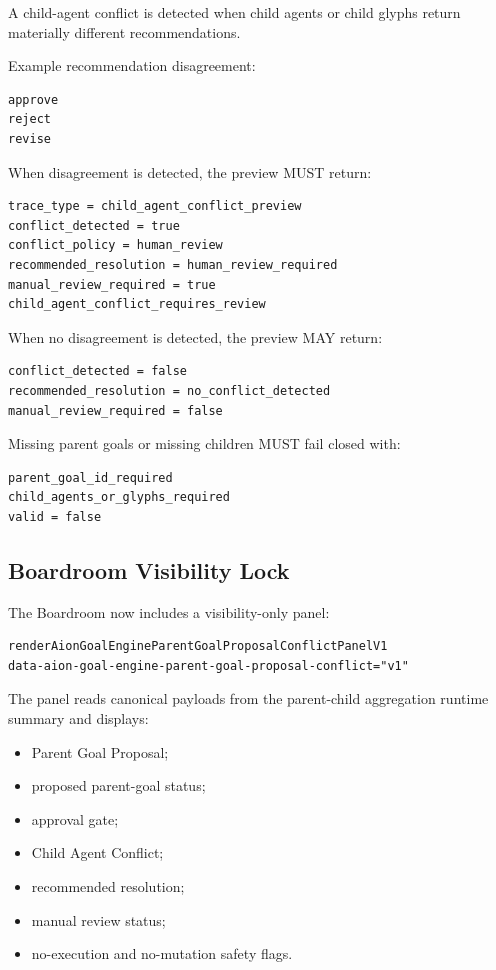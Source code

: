 A child-agent conflict is detected when child agents or child glyphs return materially different recommendations.

Example recommendation disagreement:

\begin{verbatim}
approve
reject
revise
\end{verbatim}

When disagreement is detected, the preview MUST return:

\begin{verbatim}
trace_type = child_agent_conflict_preview
conflict_detected = true
conflict_policy = human_review
recommended_resolution = human_review_required
manual_review_required = true
child_agent_conflict_requires_review
\end{verbatim}

When no disagreement is detected, the preview MAY return:

\begin{verbatim}
conflict_detected = false
recommended_resolution = no_conflict_detected
manual_review_required = false
\end{verbatim}

Missing parent goals or missing children MUST fail closed with:

\begin{verbatim}
parent_goal_id_required
child_agents_or_glyphs_required
valid = false
\end{verbatim}

\subsection{Boardroom Visibility Lock}

The Boardroom now includes a visibility-only panel:

\begin{verbatim}
renderAionGoalEngineParentGoalProposalConflictPanelV1
data-aion-goal-engine-parent-goal-proposal-conflict="v1"
\end{verbatim}

The panel reads canonical payloads from the parent-child aggregation runtime summary and displays:

\begin{itemize}
  \item Parent Goal Proposal;
  \item proposed parent-goal status;
  \item approval gate;
  \item Child Agent Conflict;
  \item recommended resolution;
  \item manual review status;
  \item no-execution and no-mutation safety flags.
\end{itemize}

